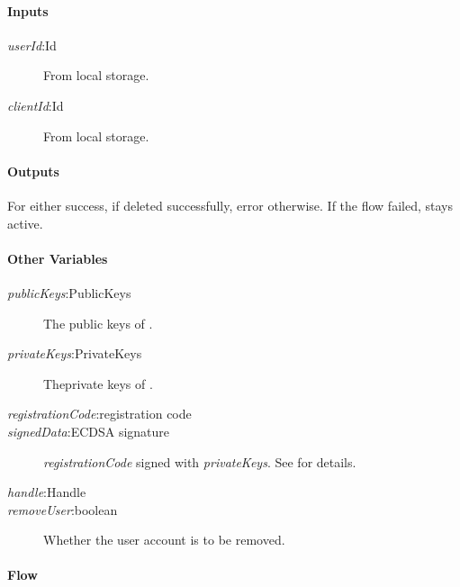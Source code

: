 \documentclass[a4paper,10pt,draft]{article}
\newcommand{\signedData}{\emph{signedData}}
\newcommand{\handle}{\emph{handle}}
\newcommand{\registrationCode}{\emph{registrationCode}}
\newcommand{\privateKeys}{\emph{privateKeys}}
\newcommand{\publicKeys}{\emph{publicKeys}}
\newcommand{\userId}{\emph{userId}}
\newcommand{\clientId}{\emph{clientId}}
\newcommand{\removeUser}{\emph{removeUser}}
\begin{document}
\paragraph{Inputs}
\SpecialItem
\begin{description}
 \item[\userId{}:Id] From \Client{} local storage.
 \item[\clientId{}:Id] From \Client{} local storage.
\end{description}

\paragraph{Outputs}
For \Client{} either success, if \Server{} deleted \Client{} successfully, 
error otherwise. If the flow failed, \Client{} stays active.

\paragraph{Other Variables}
\SpecialItem
\begin{description}
 \item[\publicKeys{}:PublicKeys] The public keys of  \Client{}. 
 \item[\privateKeys{}:PrivateKeys] Theprivate keys of \Client{}.
 \item[\registrationCode{}:registration code]
 \item[\signedData{}:ECDSA signature] \registrationCode{} signed with
\privateKeys{}. See \cite{crypto_spec} for details.
 \item[\handle{}:Handle]
 \item[\removeUser:boolean] Whether the user account is to be removed.
\end{description}

\paragraph{Flow}
\end{document}
